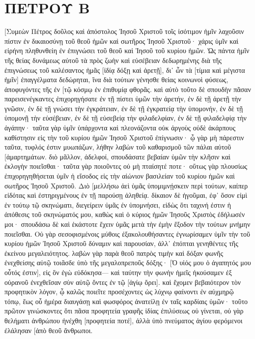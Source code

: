 \section{ΠΕΤΡΟΥ Β}
[Συμεὼν Πέτρος δοῦλος καὶ ἀπόστολος Ἰησοῦ Χριστοῦ τοῖς ἰσότιμον ἡμῖν λαχοῦσιν πίστιν ἐν δικαιοσύνῃ τοῦ θεοῦ ἡμῶν καὶ σωτῆρος Ἰησοῦ Χριστοῦ· 
χάρις ὑμῖν καὶ εἰρήνη πληθυνθείη ἐν ἐπιγνώσει τοῦ θεοῦ καὶ Ἰησοῦ τοῦ κυρίου ἡμῶν. 
Ὡς πάντα ἡμῖν τῆς θείας δυνάμεως αὐτοῦ τὰ πρὸς ζωὴν καὶ εὐσέβειαν δεδωρημένης διὰ τῆς ἐπιγνώσεως τοῦ καλέσαντος ἡμᾶς [ἰδίᾳ δόξῃ καὶ ἀρετῇ], 
δι᾽ ὧν τὰ [τίμια καὶ μέγιστα ἡμῖν] ἐπαγγέλματα δεδώρηται, ἵνα διὰ τούτων γένησθε θείας κοινωνοὶ φύσεως, ἀποφυγόντες τῆς ἐν [τῷ κόσμῳ ἐν ἐπιθυμίᾳ φθορᾶς. 
καὶ αὐτὸ τοῦτο δὲ σπουδὴν πᾶσαν παρεισενέγκαντες ἐπιχορηγήσατε ἐν τῇ πίστει ὑμῶν τὴν ἀρετήν, ἐν δὲ τῇ ἀρετῇ τὴν γνῶσιν, 
ἐν δὲ τῇ γνώσει τὴν ἐγκράτειαν, ἐν δὲ τῇ ἐγκρατείᾳ τὴν ὑπομονήν, ἐν δὲ τῇ ὑπομονῇ τὴν εὐσέβειαν, 
ἐν δὲ τῇ εὐσεβείᾳ τὴν φιλαδελφίαν, ἐν δὲ τῇ φιλαδελφίᾳ τὴν ἀγάπην· 
ταῦτα γὰρ ὑμῖν ὑπάρχοντα καὶ πλεονάζοντα οὐκ ἀργοὺς οὐδὲ ἀκάρπους καθίστησιν εἰς τὴν τοῦ κυρίου ἡμῶν Ἰησοῦ Χριστοῦ ἐπίγνωσιν· 
ᾧ γὰρ μὴ πάρεστιν ταῦτα, τυφλός ἐστιν μυωπάζων, λήθην λαβὼν τοῦ καθαρισμοῦ τῶν πάλαι αὐτοῦ [ἁμαρτημάτων. 
διὸ μᾶλλον, ἀδελφοί, σπουδάσατε βεβαίαν ὑμῶν τὴν κλῆσιν καὶ ἐκλογὴν ποιεῖσθαι· ταῦτα γὰρ ποιοῦντες οὐ μὴ πταίσητέ ποτε· 
οὕτως γὰρ πλουσίως ἐπιχορηγηθήσεται ὑμῖν ἡ εἴσοδος εἰς τὴν αἰώνιον βασιλείαν τοῦ κυρίου ἡμῶν καὶ σωτῆρος Ἰησοῦ Χριστοῦ. 
Διὸ [μελλήσω ἀεὶ ὑμᾶς ὑπομιμνῄσκειν περὶ τούτων, καίπερ εἰδότας καὶ ἐστηριγμένους ἐν τῇ παρούσῃ ἀληθείᾳ. 
δίκαιον δὲ ἡγοῦμαι, ἐφ᾽ ὅσον εἰμὶ ἐν τούτῳ τῷ σκηνώματι, διεγείρειν ὑμᾶς ἐν ὑπομνήσει, 
εἰδὼς ὅτι ταχινή ἐστιν ἡ ἀπόθεσις τοῦ σκηνώματός μου, καθὼς καὶ ὁ κύριος ἡμῶν Ἰησοῦς Χριστὸς ἐδήλωσέν μοι· 
σπουδάσω δὲ καὶ ἑκάστοτε ἔχειν ὑμᾶς μετὰ τὴν ἐμὴν ἔξοδον τὴν τούτων μνήμην ποιεῖσθαι. 
Οὐ γὰρ σεσοφισμένοις μύθοις ἐξακολουθήσαντες ἐγνωρίσαμεν ὑμῖν τὴν τοῦ κυρίου ἡμῶν Ἰησοῦ Χριστοῦ δύναμιν καὶ παρουσίαν, ἀλλ᾽ ἐπόπται γενηθέντες τῆς ἐκείνου μεγαλειότητος. 
λαβὼν γὰρ παρὰ θεοῦ πατρὸς τιμὴν καὶ δόξαν φωνῆς ἐνεχθείσης αὐτῷ τοιᾶσδε ὑπὸ τῆς μεγαλοπρεποῦς δόξης· [Ὁ υἱός μου ὁ ἀγαπητός μου οὗτός ἐστιν], εἰς ὃν ἐγὼ εὐδόκησα— 
καὶ ταύτην τὴν φωνὴν ἡμεῖς ἠκούσαμεν ἐξ οὐρανοῦ ἐνεχθεῖσαν σὺν αὐτῷ ὄντες ἐν τῷ [ἁγίῳ ὄρει]. 
καὶ ἔχομεν βεβαιότερον τὸν προφητικὸν λόγον, ᾧ καλῶς ποιεῖτε προσέχοντες ὡς λύχνῳ φαίνοντι ἐν αὐχμηρῷ τόπῳ, ἕως οὗ ἡμέρα διαυγάσῃ καὶ φωσφόρος ἀνατείλῃ ἐν ταῖς καρδίαις ὑμῶν· 
τοῦτο πρῶτον γινώσκοντες ὅτι πᾶσα προφητεία γραφῆς ἰδίας ἐπιλύσεως οὐ γίνεται, 
οὐ γὰρ θελήματι ἀνθρώπου ἠνέχθη [προφητεία ποτέ], ἀλλὰ ὑπὸ πνεύματος ἁγίου φερόμενοι ἐλάλησαν [ἀπὸ θεοῦ ἄνθρωποι. 
